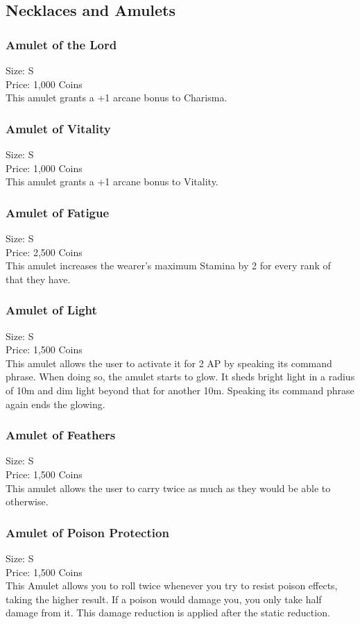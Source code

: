 \subsection{Necklaces and Amulets}\label{subsec:amulets}

\subsubsection{Amulet of the Lord}\label{item:amuletOfLord}
Size: S\\
Price: 1,000 Coins\\
This amulet grants a +1 arcane bonus to Charisma.

\subsubsection{Amulet of Vitality}\label{item:amuletOfVitality}
Size: S\\
Price: 1,000 Coins\\
This amulet grants a +1 arcane bonus to Vitality.

\subsubsection{Amulet of Fatigue}\label{item:amuletOfFatigue}
Size: S\\
Price: 2,500 Coins\\
This amulet increases the wearer's maximum Stamina by 2 for every rank of ~ that they have.

\subsubsection{Amulet of Light}\label{item:amuletOfLight}
Size: S\\
Price: 1,500 Coins\\
This amulet allows the user to activate it for 2 AP by speaking its command phrase.
When doing so, the amulet starts to glow.
It sheds bright light in a radius of 10m and dim light beyond that for another 10m.
Speaking its command phrase again ends the glowing.

\subsubsection{Amulet of Feathers}\label{item:amuletOfFeathers}
Size: S\\
Price: 1,500 Coins\\
This amulet allows the user to carry twice as much as they would be able to otherwise.

\subsubsection{Amulet of Poison Protection}\label{item:amuletOfAntidote}
Size: S\\
Price: 1,500 Coins\\
This Amulet allows you to roll twice whenever you try to resist poison effects, taking the higher result.
If a poison would damage you, you only take half damage from it.
This damage reduction is applied after the static reduction.